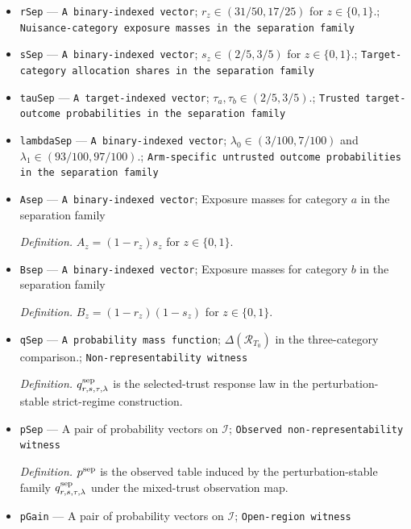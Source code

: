 \documentclass{article}
\begin{document}
\begin{itemize}
  \par\smallskip\noindent\emph{Definition.} \(T_1=\{a,b,c_\star\}=\mathcal E\) in the three-category comparison.
  \item \texttt{rSep} --- \texttt{A binary-\allowbreak{}indexed vector}; \(r_z\in(31/50,17/25)\) for \(z\in\{0,1\}\).; \texttt{Nuisance-\allowbreak{}category exposure masses in the separation family}
  \item \texttt{sSep} --- \texttt{A binary-\allowbreak{}indexed vector}; \(s_z\in(2/5,3/5)\) for \(z\in\{0,1\}\).; \texttt{Target-\allowbreak{}category allocation shares in the separation family}
  \item \texttt{tauSep} --- \texttt{A target-\allowbreak{}indexed vector}; \(\tau_a,\tau_b\in(2/5,3/5)\).; \texttt{Trusted target-\allowbreak{}outcome probabilities in the separation family}
  \item \texttt{lambdaSep} --- \texttt{A binary-\allowbreak{}indexed vector}; \(\lambda_0\in(3/100,7/100)\) and \(\lambda_1\in(93/100,97/100)\).; \texttt{Arm-\allowbreak{}specific untrusted outcome probabilities in the separation family}
  \item \texttt{Asep} --- \texttt{A binary-\allowbreak{}indexed vector}; Exposure masses for category \(a\) in the separation family
  \par\smallskip\noindent\emph{Definition.} \(A_z=(1-r_z)s_z\) for \(z\in\{0,1\}\).
  \item \texttt{Bsep} --- \texttt{A binary-\allowbreak{}indexed vector}; Exposure masses for category \(b\) in the separation family
  \par\smallskip\noindent\emph{Definition.} \(B_z=(1-r_z)(1-s_z)\) for \(z\in\{0,1\}\).
  \item \texttt{qSep} --- \texttt{A probability mass function}; \(\Delta(\mathcal R_{T_0})\) in the three-category comparison.; \texttt{Non-\allowbreak{}representability witness}
  \par\smallskip\noindent\emph{Definition.} \(q^{\rm sep}_{r,s,\tau,\lambda}\) is the selected-trust response law in the perturbation-stable strict-regime construction.
  \item \texttt{pSep} --- A pair of probability vectors on \(\mathcal I\); \texttt{Observed non-\allowbreak{}representability witness}
  \par\smallskip\noindent\emph{Definition.} \(p^{\rm sep}\) is the observed table induced by the perturbation-stable family \(q^{\rm sep}_{r,s,\tau,\lambda}\) under the mixed-trust observation map.
  \item \texttt{pGain} --- A pair of probability vectors on \(\mathcal I\); \texttt{Open-\allowbreak{}region witness}

\end{itemize}
\end{document}

